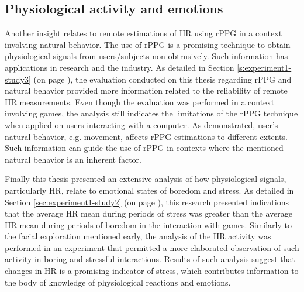 \subsection{Physiological activity and emotions}

Another insight relates to remote estimations of HR using rPPG in a context involving natural behavior. The use of rPPG is a promising technique to obtain physiological signals from users/subjects non-obtrusively. Such information has applications in research and the industry. As detailed in Section \ref{s:experiment1-study3} (on page \pageref{s:experiment1-study3}), the evaluation conducted on this thesis regarding rPPG and natural behavior provided more information related to the reliability of remote HR measurements. Even though the evaluation was performed in a context involving games, the analysis still indicates the limitations of the rPPG technique when applied on users interacting with a computer. As demonstrated, user's natural behavior, e.g. movement, affects rPPG estimations to different extents. Such information can guide the use of rPPG in contexts where the mentioned natural behavior is an inherent factor.

Finally this thesis presented an extensive analysis of how physiological signals, particularly HR, relate to emotional states of boredom and stress. As detailed in Section \ref{sec:experiment1-study2} (on page \pageref{sec:experiment1-study2}), this research presented indications that the average HR mean during periods of stress was greater than the average HR mean during periods of boredom in the interaction with games. Similarly to the facial exploration mentioned early, the analysis of the HR activity was performed in an experiment that permitted a more elaborated observation of such activity in boring and stressful interactions. Results of such analysis suggest that changes in HR is a promising indicator of stress, which contributes information to the body of knowledge of physiological reactions and emotions.



